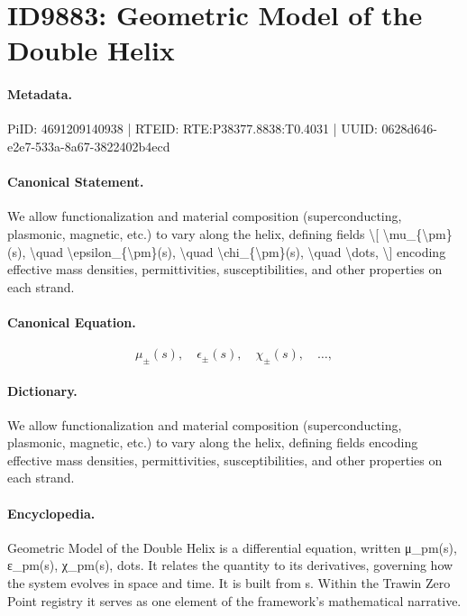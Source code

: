 \section*{ID9883: Geometric Model of the Double Helix}
\paragraph{Metadata.}
PiID: 4691209140938 | RTEID: RTE:P38377.8838:T0.4031 | UUID: 0628d646-e2e7-533a-8a67-3822402b4ecd

\paragraph{Canonical Statement.}
We allow functionalization and material composition (superconducting, plasmonic, magnetic, etc.) to vary along the helix, defining fields \textbackslash{}[ \textbackslash{}mu\_\{\textbackslash{}pm\}(s), \textbackslash{}quad \textbackslash{}epsilon\_\{\textbackslash{}pm\}(s), \textbackslash{}quad \textbackslash{}chi\_\{\textbackslash{}pm\}(s), \textbackslash{}quad \textbackslash{}dots, \textbackslash{}] encoding effective mass densities, permittivities, susceptibilities, and other properties on each strand.

\paragraph{Canonical Equation.}
\[
\mu_{\pm}(s), \quad \epsilon_{\pm}(s), \quad \chi_{\pm}(s), \quad \dots,
\]

\paragraph{Dictionary.}
We allow functionalization and material composition (superconducting, plasmonic, magnetic, etc.) to vary along the helix, defining fields encoding effective mass densities, permittivities, susceptibilities, and other properties on each strand.

\paragraph{Encyclopedia.}
Geometric Model of the Double Helix is a differential equation, written μ\_pm(s), ε\_pm(s), χ\_pm(s), dots. It relates the quantity to its derivatives, governing how the system evolves in space and time. It is built from s. Within the Trawin Zero Point registry it serves as one element of the framework's mathematical narrative.
